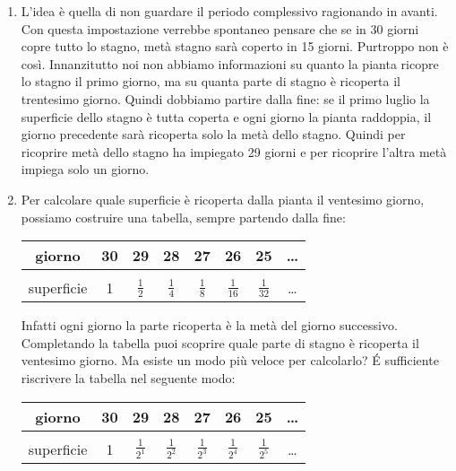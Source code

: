 \begin{enumerate}
 \item
L'idea è quella di non guardare il periodo complessivo 
ragionando in avanti. Con questa impostazione verrebbe spontaneo pensare 
che se 
in 30 giorni copre tutto lo stagno, metà stagno sarà coperto in 15 giorni. 
Purtroppo non 
è così.
Innanzitutto noi non abbiamo informazioni su quanto la pianta ricopre lo 
stagno il primo 
giorno, ma su quanta parte di stagno è ricoperta il trentesimo giorno.
Quindi dobbiamo partire dalla fine: se il primo luglio la superficie dello 
stagno è tutta coperta e ogni giorno la pianta raddoppia, il giorno 
precedente 
sarà ricoperta solo la metà dello stagno. Quindi per ricoprire metà dello 
stagno 
ha impiegato 29 giorni e per ricoprire l'altra metà impiega solo un giorno.

 \item
Per calcolare quale superficie è ricoperta dalla pianta il ventesimo 
giorno, 
possiamo costruire una tabella, sempre partendo dalla fine:

\begin{center}
\begin{tabular}{c|c|c|c|c|c|c|c}
giorno & 30 & 29 & 28 & 27 & 26 & 25 & \dots \\[6pt]
\hline &&&&&&\\ [-6pt]
superficie & 1 & \(\frac{1}{2}\) & 
 \(\frac{1}{4}\) & 
 \(\frac{1}{8}\) & 
 \(\frac{1}{16}\) & 
 \(\frac{1}{32}\) & \dots \\
\end{tabular}
\end{center}

Infatti ogni giorno la parte ricoperta è la metà del giorno successivo.
Completando la tabella puoi scoprire quale parte di stagno è ricoperta il 
ventesimo giorno. Ma esiste un modo più veloce per calcolarlo?
\'E sufficiente riscrivere la tabella nel seguente modo:

\begin{center}
\begin{tabular}{c|c|c|c|c|c|c|c}
giorno & 30 & 29 & 28 & 27 & 26 & 25 & \dots \\[6pt]
\hline &&&&&&\\ [-6pt]
superficie & 1 & \(\frac{1}{2^1}\) & 
 \(\frac{1}{2^2}\) & 
 \(\frac{1}{2^3}\) & 
 \(\frac{1}{2^4}\) & 
 \(\frac{1}{2^5}\) & \dots \\
\end{tabular}
\end{center}


\end{enumerate}
